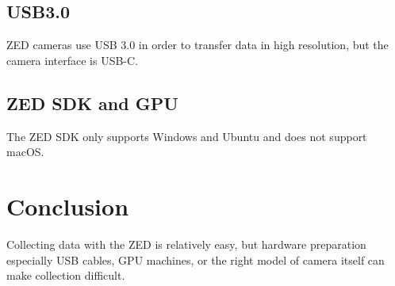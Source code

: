 \subsection{USB3.0}

ZED cameras use USB 3.0 in order to transfer data in high resolution, but the camera interface is USB-C. 

\subsection{ZED SDK and GPU}

The ZED SDK only supports Windows and Ubuntu and does not support macOS. 

\section*{Conclusion}
Collecting data with the ZED is relatively easy, but hardware preparation especially USB cables, GPU machines, or the right model of camera itself can make collection difficult.

